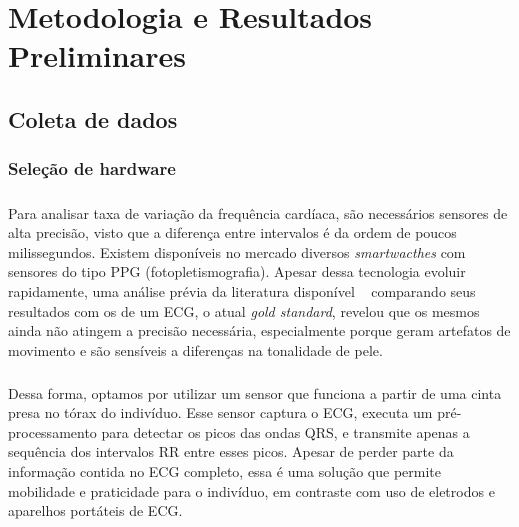 \chapter{Metodologia e Resultados Preliminares}
\label{methods}



    \section{Coleta de dados}
    \label{collect}

        \subsection{Seleção de hardware}
        \label{hardware}
    
            \paragraph{}
            Para analisar taxa de variação da frequência cardíaca, são necessários sensores de alta precisão, visto que a diferença entre intervalos é da ordem de poucos milissegundos. Existem disponíveis no mercado diversos \textit{smartwacthes} com sensores do tipo PPG (fotopletismografia). Apesar dessa tecnologia evoluir rapidamente, uma análise prévia da literatura disponível ~\cite{Parak2014EvaluationPhotopletysmography, Schafer2013HowElectrocardiogram.} comparando seus resultados com os de um ECG, o atual \textit{gold standard},  revelou que os mesmos ainda não atingem a precisão necessária, especialmente porque geram artefatos de movimento e são sensíveis a diferenças na tonalidade de pele.
            
            \paragraph{}
            Dessa forma, optamos por utilizar um sensor que funciona a partir de uma cinta presa no tórax do indivíduo. Esse sensor captura o ECG, executa um pré-processamento para detectar os picos das ondas QRS, e transmite apenas a sequência dos intervalos RR entre esses picos. Apesar de perder parte da informação contida no ECG completo, essa é uma solução que permite mobilidade e praticidade para o indivíduo, em contraste com uso de eletrodos e aparelhos portáteis de ECG.
            
